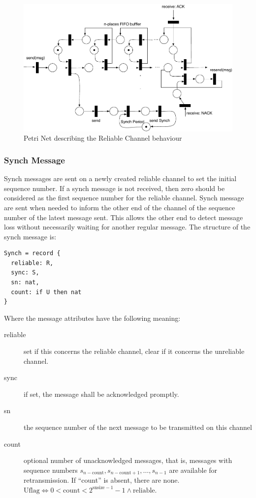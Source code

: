 \documentclass[a4paper,oneside,article]{memoir}
\begin{document}
\begin{figure}
\centering
\includegraphics[scale=0.6]{xrce-relchan.pdf}
\caption{Petri Net describing the Reliable Channel behaviour}\label{fig:reliable-channel}
\end{figure}

\subsubsection{Synch Message}

Synch messages are sent on a newly created reliable channel to set the initial sequence number.  If
a synch message is not received, then zero should be considered as the first sequence number for the
reliable channel.  Synch message are sent when needed to inform the other end of the channel of the
sequence number of the latest message sent.  This allows the other end to detect message loss
without necessarily waiting for another regular message.  The structure of the synch message is:
\begin{verbatim}
Synch = record {
  reliable: R,
  sync: S,
  sn: nat,
  count: if U then nat
}
\end{verbatim}
Where the message attributes have the following meaning:
\begin{description}
\item[reliable] set if this concerns the reliable channel, clear if it concerns the unreliable
  channel.
\item[sync] if set, the message shall be acknowledged promptly.
\item[sn] the sequence number of the next message to be transmitted on this channel
\item[count] optional number of unacknowledged messages, that is, messages with sequence numbers
  $s_{n-\mathrm{count}}, s_{n-\mathrm{count}+1}, \ldots{}, s_{n-1}$ are available for
  retransmission.  If ``count'' is absent, there are none.
  $\mathrm{Uflag} \Leftrightarrow 0 < \mathrm{count} < 2^{\mathrm{snsize}-1}-1 \wedge
  \mathrm{reliable} $.
\end{description}
\end{document}

